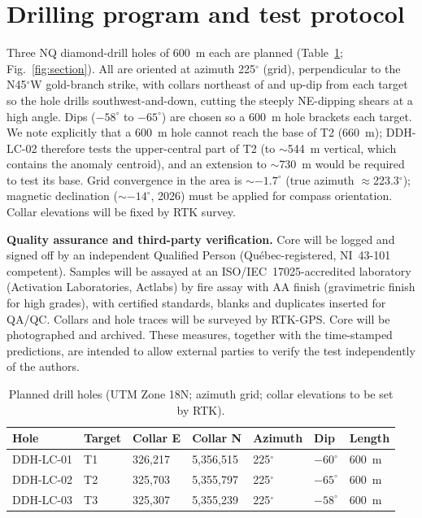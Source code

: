 \documentclass[11pt]{article}
\begin{document}
\section{Drilling program and test protocol}\label{sec:protocol}
Three NQ diamond-drill holes of 600~m each are planned (Table~\ref{tab:drill};
Fig.~\ref{fig:section}). All are oriented at azimuth 225$^\circ$ (grid), perpendicular to the
N45$^\circ$W gold-branch strike, with collars northeast of and up-dip from each target so the
hole drills southwest-and-down, cutting the steeply NE-dipping shears at a high angle. Dips
($-58^\circ$ to $-65^\circ$) are chosen so a 600~m hole brackets each target. We note explicitly
that a 600~m hole cannot reach the base of T2 (660~m); DDH-LC-02 therefore tests the
upper-central part of T2 (to $\sim$544~m vertical, which contains the anomaly centroid), and an
extension to $\sim$730~m would be required to test its base. Grid convergence in the area is
$\sim-1.7^\circ$ (true azimuth $\approx$223.3$^\circ$); magnetic declination ($\sim-14^\circ$,
2026) must be applied for compass orientation. Collar elevations will be fixed by RTK survey.

\textbf{Quality assurance and third-party verification.} Core will be logged and signed off by
an independent Qualified Person (Qu\'ebec-registered, NI~43-101 competent). Samples will be
assayed at an ISO/IEC~17025-accredited laboratory (Activation Laboratories, Actlabs) by fire
assay with AA finish (gravimetric finish for high grades), with certified standards, blanks and
duplicates inserted for QA/QC. Collars and hole traces will be surveyed by RTK-GPS. Core will be
photographed and archived. These measures, together with the time-stamped predictions, are
intended to allow external parties to verify the test independently of the authors.

\begin{table}[t]
\centering\small
\caption{Planned drill holes (UTM Zone 18N; azimuth grid; collar elevations to be set by RTK).}
\label{tab:drill}
\begin{tabular}{lllllll}
\toprule
Hole & Target & Collar E & Collar N & Azimuth & Dip & Length \\
\midrule
DDH-LC-01 & T1 & 326,217 & 5,356,515 & 225$^\circ$ & $-60^\circ$ & 600~m \\
DDH-LC-02 & T2 & 325,703 & 5,355,797 & 225$^\circ$ & $-65^\circ$ & 600~m \\
DDH-LC-03 & T3 & 325,307 & 5,355,239 & 225$^\circ$ & $-58^\circ$ & 600~m \\
\bottomrule
\end{tabular}
\end{table}
\end{document}

